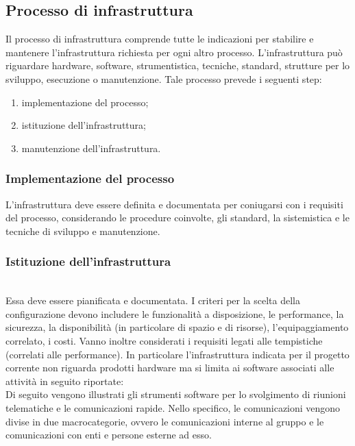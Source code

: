 \subsection{Processo di infrastruttura}
Il processo di infrastruttura comprende tutte le indicazioni per stabilire e mantenere l'infrastruttura richiesta per ogni altro processo. L'infrastruttura può riguardare hardware, software, strumentistica, tecniche, standard, strutture per lo sviluppo, esecuzione o manutenzione.
Tale processo prevede i seguenti step:

\begin{enumerate}
    \item implementazione del processo;
    \item istituzione dell'infrastruttura;
    \item manutenzione dell'infrastruttura.
\end{enumerate}

\subsubsection{Implementazione del processo}
L'infrastruttura deve essere definita e documentata per coniugarsi con i requisiti del processo, considerando le procedure coinvolte, gli standard, la sistemistica e le tecniche di sviluppo e manutenzione.

\subsubsection{Istituzione dell'infrastruttura}

\leavevmode \\
Essa deve essere pianificata e documentata. I criteri per la scelta della configurazione devono includere le funzionalità a disposizione, le performance, la sicurezza, la disponibilità (in particolare di spazio e di risorse), l'equipaggiamento correlato, i costi. Vanno inoltre considerati i requisiti legati alle tempistiche (correlati alle performance).
In particolare l'infrastruttura indicata per il progetto corrente non riguarda prodotti hardware ma si limita ai software associati alle attività in seguito riportate:
\leavevmode \\

Di seguito  vengono illustrati gli strumenti software per lo svolgimento di riunioni telematiche e le comunicazioni rapide. Nello specifico, le comunicazioni vengono divise in due macrocategorie, ovvero le comunicazioni interne al gruppo e le comunicazioni con enti e persone esterne ad esso.

